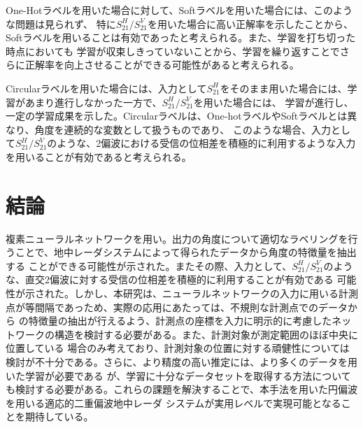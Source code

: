 \documentclass[11pt,a4paper,uplatex]{ujarticle}
\begin{document}
  One-Hotラベルを用いた場合に対して、Softラベルを用いた場合には、このような問題は見られず、
  特に$S_{21}^H/S_{21}^V$を用いた場合に高い正解率を示したことから、Softラベルを用いることは有効であったと考えられる。また、学習を打ち切った時点においても
  学習が収束しきっていないことから、学習を繰り返すことでさらに正解率を向上させることができる可能性があると考えられる。

  Circularラベルを用いた場合には、入力として$S_{21}^H$をそのまま用いた場合には、学習があまり進行しなかった一方で、$S_{21}^H/S_{21}^V$を用いた場合には、
  学習が進行し、一定の学習成果を示した。Circularラベルは、One-hotラベルやSoftラベルとは異なり、角度を連続的な変数として扱うものであり、
  このような場合、入力として$S_{21}^H/S_{21}^V$のような、2偏波における受信の位相差を積極的に利用するような入力を用いることが有効であると考えられる。

\section{結論}

  複素ニューラルネットワークを用い。出力の角度について適切なラベリングを行うことで、地中レーダシステムによって得られたデータから角度の特徴量を抽出する
  ことができる可能性が示された。またその際、入力として、$S_{21}^H/S_{21}^V$のような、直交2偏波に対する受信の位相差を積極的に利用することが有効である
  可能性が示された。しかし、本研究は、ニューラルネットワークの入力に用いる計測点が等間隔であっため、実際の応用にあたっては、不規則な計測点でのデータから
  の特徴量の抽出が行えるよう、計測点の座標を入力に明示的に考慮したネットワークの構造を検討する必要がある。また、計測対象が測定範囲のほぼ中央に位置している
  場合のみ考えており、計測対象の位置に対する頑健性については検討が不十分である。さらに、より精度の高い推定には、より多くのデータを用いた学習が必要である
  が、学習に十分なデータセットを取得する方法についても検討する必要がある。これらの課題を解決することで、本手法を用いた円偏波を用いる適応的二重偏波地中レーダ
  システムが実用レベルで実現可能となることを期待している。


\newpage


\end{document}
